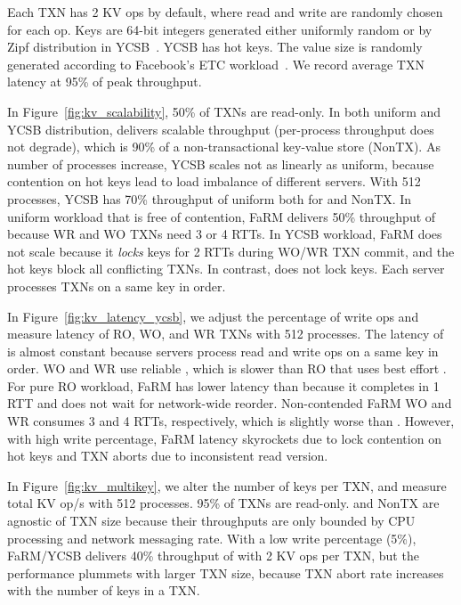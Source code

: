 Each TXN has 2 KV ops by default, where read and write are randomly chosen for each op.
Keys are 64-bit integers generated either uniformly random or by Zipf distribution in YCSB~\cite{cooper2010benchmarking}. YCSB has hot keys.
The value size is randomly generated according to Facebook's ETC workload~\cite{atikoglu2012workload}.
We record average TXN latency at 95\% of peak throughput.


In Figure~\ref{fig:kv_scalability}, 50\% of TXNs are read-only.
In both uniform and YCSB distribution, \sys{} delivers scalable throughput (per-process throughput does not degrade), which is 90\% of a non-transactional key-value store (NonTX).
As number of processes increase, YCSB scales not as linearly as uniform, because contention on hot keys lead to load imbalance of different servers.
With 512 processes, YCSB has 70\% throughput of uniform both for \sys{} and NonTX.
In uniform workload that is free of contention, FaRM delivers 50\% throughput of \sys{} because WR and WO TXNs need 3 or 4 RTTs.
In YCSB workload, FaRM does not scale because it \emph{locks} keys for 2 RTTs during WO/WR TXN commit, and the hot keys block all conflicting TXNs.
In contrast, \sys{} does not lock keys. Each server processes TXNs on a same key in order.

In Figure~\ref{fig:kv_latency_ycsb}, we adjust the percentage of write ops and measure latency of RO, WO, and WR TXNs with 512 processes.
The latency of \sys{} is almost constant because servers process read and write ops on a same key in order. WO and WR use reliable \sys{}, which is slower than RO that uses best effort \sys{}.
For pure RO workload, FaRM has lower latency than \sys{} because it completes in 1 RTT and does not wait for network-wide reorder.
Non-contended FaRM WO and WR consumes 3 and 4 RTTs, respectively, which is slightly worse than \sys{}.
However, with high write percentage, FaRM latency skyrockets due to lock contention on hot keys and TXN aborts due to inconsistent read version.

In Figure~\ref{fig:kv_multikey}, we alter the number of keys per TXN, and measure total KV op/s with 512 processes.
95\% of TXNs are read-only.
\sys{} and NonTX are agnostic of TXN size because their throughputs are only bounded by CPU processing and network messaging rate.
With a low write percentage (5\%), FaRM/YCSB delivers 40\% throughput of \sys{} with 2 KV ops per TXN, but the performance plummets with larger TXN size, because TXN abort rate increases with the number of keys in a TXN.

